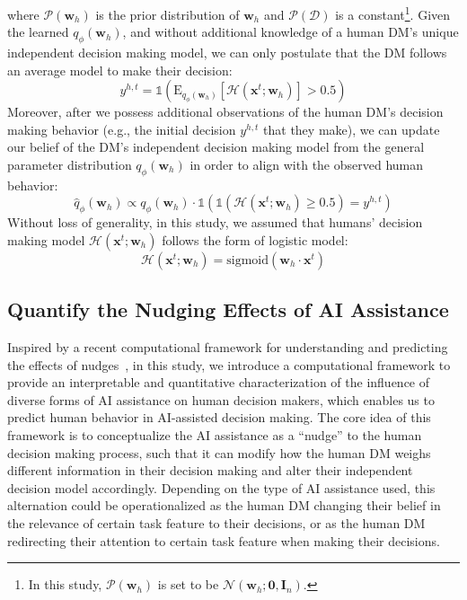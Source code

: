 \documentclass[letterpaper]{article} %
\begin{document}
\noindent where $\mathcal{P}(\bm{w}_h)$ is the prior distribution of $\bm{w}_h$ and  $\mathcal{P}(\mathcal{D})$ is a constant\footnote{In this study, $\mathcal{P}(\bm{w}_h)$ is set to be  $\mathcal{N}(\bm{w}_h; \bm{0},\bm{I}_n)$.}. 
Given the learned $q_{\phi}(\bm{w}_h)$, and without additional knowledge of a human DM's unique independent decision making model, we can only postulate that the DM  follows an average model to make their decision:
\begin{equation}
   y^{h,t} =  \mathds{1}(\mathrm{E}_{q_{\phi}(\bm{w}_h)} [ \mathcal{H}(\bm{x}^t;\bm{w}_h)]>0.5)
   \label{average_prediction}
\end{equation}
Moreover, after we possess additional observations of the human DM's decision making behavior (e.g., the initial decision $y^{h,t}$ that they make), we can update our belief of the DM's independent decision making model from  the general parameter distribution $q_{\phi}(\bm{w}_h)$ in order to 
align with the observed human behavior:
\begin{equation}
\hat{q}_{\phi}(\bm{w}_h) \propto q_{\phi}(\bm{w}_h) \cdot \mathds{1}(\mathds{1}( \mathcal{H}(\bm{x}^t;\bm{w}_h) \geq 0.5 )  = y^{h,t})
\label{sample}
\end{equation}
Without loss of generality, in this study, 
we assumed that humans' decision making model $\mathcal{H}(\bm{x}^t;\bm{w}_h)$ follows the form of logistic model:
\begin{equation}
    \mathcal{H}(\bm{x}^t;\bm{w}_h) = \text{sigmoid}(\bm{w}_h \cdot \bm{x}^t)
\end{equation}

\subsection{Quantify the Nudging Effects of AI Assistance}
Inspired by a recent computational framework for understanding and predicting the effects of nudges~\cite{callaway2022optimal}, 
in this study, we introduce a computational framework 
to provide an interpretable and quantitative characterization of the influence of diverse forms of AI assistance on human decision makers, which enables us to predict human behavior in AI-assisted decision making. 
The core idea of this framework is to conceptualize the AI assistance as a ``nudge'' to the human decision making
process, 
such that it can modify how the human DM weighs different information in their decision making and alter their independent decision model accordingly. Depending on the type of AI assistance used, this alternation could be operationalized as the human DM changing their belief in the relevance of certain task feature to their decisions, or as the human DM redirecting their attention to certain task feature when making their decisions. 
\end{document}
